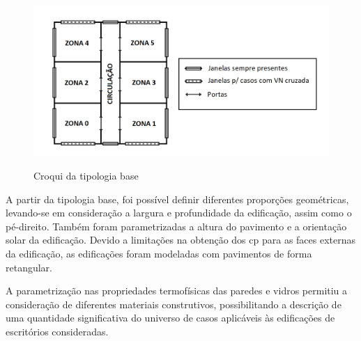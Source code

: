 \begin{figure}[h]
	\centering
	\caption{Croqui da tipologia base}
	\includegraphics[width=.8\linewidth]{img/croqui_07-11.png}
	\label{fig:croqui}
\end{figure}


A partir da tipologia base, foi possível definir diferentes proporções geométricas, levando-se em consideração a largura e profundidade da edificação, assim como o pé-direito. Também foram parametrizadas a altura do pavimento e a orientação solar da edificação.
Devido a limitações na obtenção dos \acrfull{cp} para as faces externas da edificação, as edificações foram modeladas com pavimentos de forma retangular.

A parametrização nas propriedades termofísicas das paredes e vidros permitiu a consideração de diferentes materiais construtivos, possibilitando a descrição de uma quantidade significativa do universo de casos aplicáveis às edificações de escritórios consideradas. %


